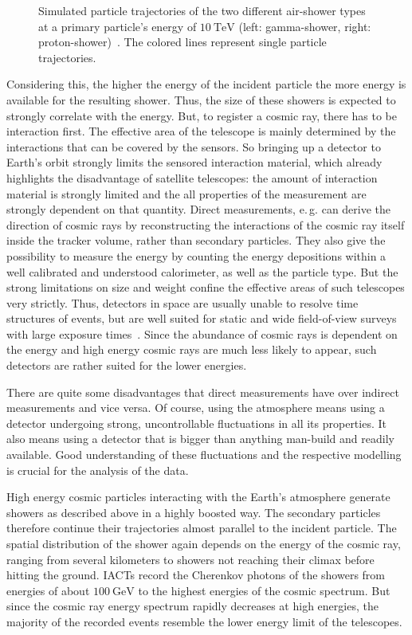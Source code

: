 \begin{figure}
\begin{subfigure}{0.475\textwidth}
    \label{fig:gamma}
  \end{subfigure}
  \caption{Simulated particle trajectories of the two different air-shower types at a primary particle's energy of $\SI{10}{\tera\electronvolt}$ (left: gamma-shower, right: proton-shower)~\cite{shower}. The colored lines represent single particle trajectories.}
  \label{fig:shower}
\end{figure}

Considering this, the higher the energy of the incident particle the more
energy is available for the resulting shower. Thus, the size of these showers
is expected to strongly correlate with the energy. But, to register a cosmic
ray, there has to be interaction first. The effective area of the telescope
is mainly determined by the interactions that can be covered by the sensors. So
bringing up a detector to Earth's orbit strongly limits the sensored
interaction material, which already highlights the disadvantage of satellite
telescopes: the amount of interaction material is strongly limited and the all properties of the measurement are strongly dependent on that quantity. Direct measurements, e.\,g.
can derive the direction of cosmic rays by reconstructing the interactions of
the cosmic ray itself inside the tracker volume, rather than secondary
particles. They also give the possibility to measure the energy by counting the
energy depositions within a well calibrated and understood calorimeter, as well
as the particle type. But the strong limitations on size and weight confine the
effective areas of such telescopes very strictly. Thus, detectors in space are
usually unable to resolve time structures of events, but are well suited for
static and wide field-of-view surveys with large exposure times~\cite{sebastian}. Since the
abundance of cosmic rays is dependent on the energy and high energy cosmic rays
are much less likely to appear, such detectors are rather suited for the lower
energies.

There are quite some disadvantages that direct measurements have over
indirect measurements and vice versa. Of course, using the atmosphere means
using a detector undergoing strong, uncontrollable fluctuations in all its
properties. It also means using a detector that is bigger than anything
man-build and readily available. Good understanding of these fluctuations and
the respective modelling is crucial for the analysis of the data.

High energy cosmic particles interacting with the Earth's atmosphere generate
showers as described above in a highly boosted way. The secondary particles
therefore continue their trajectories almost parallel to the incident particle.
The spatial distribution of the shower again depends on the energy of the
cosmic ray, ranging from several kilometers to showers not reaching their
climax before hitting the ground. IACTs record the Cherenkov photons of the
showers from energies of about $\SI{100}{\giga\electronvolt}$ to the highest
energies of the cosmic spectrum. But since the cosmic ray energy spectrum
rapidly decreases at high energies, the majority of the recorded events
resemble the lower energy limit of the telescopes.
